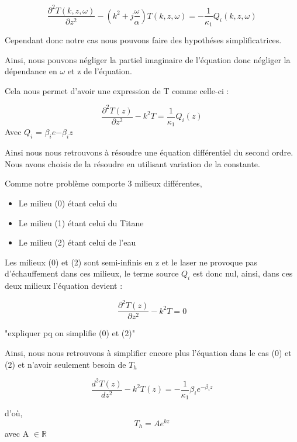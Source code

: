 \documentclass{rapportECC}
\begin{document}
\begin{equation}
    \frac{\partial^2 T(k,z,\omega)}{\partial z^2} - (k^2 + j\frac{\omega}{\alpha}) T(k,z,\omega) = - \frac{1}{\kappa_1} Q_i(k,z,\omega)
\end{equation}

Cependant donc notre cas nous pouvons faire des hypothéses simplificatrices.

Ainsi, nous pouvons négliger la partiel imaginaire de l'équation donc négliger la dépendance en $\omega$ et z de l'équation.

Cela nous permet d'avoir une expression de T comme celle-ci :

\begin{equation}
    \frac{\partial^2 T(z)}{\partial z^2} - k^2 T = \frac{1}{\kappa_1}Q_i(z)
\end{equation}
Avec $Q_i$ = $\beta_i e{-\beta_i z}$


Ainsi nous nous retrouvons à résoudre une équation différentiel du second ordre.\\
Nous avons choisis de la résoudre en utilisant variation de la constante.

Comme notre problème comporte 3 milieux différentes,
\begin{itemize}
    \item Le milieu (0) étant celui du 
    \item Le milieu (1) étant celui du Titane
    \item Le milieu (2) étant celui de l'eau
\end{itemize}

Les milieux (0) et (2) sont semi-infinis en z et le laser ne provoque pas d'échauffement dans ces milieux, le terme source $Q_i$ est donc nul, ainsi, dans ces deux milieux l'équation devient :

\begin{equation}
    \frac{\partial^2 T(z)}{\partial z^2} - k^2 T = 0
\end{equation}

"expliquer pq on simplifie (0) et (2)"

Ainsi, nous nous retrouvons à simplifier encore plus l'équation dans le cas (0) et (2) et n'avoir seulement besoin de $T_h$

\begin{equation*}
    \frac{d^2 T(z)}{d z^2} - k^2 T(z) = - \frac{1}{\kappa_1}\beta_i e^{-\beta_iz}
\end{equation*}

d'où,
\begin{equation}
    T_h = A e^{kz} 
\end{equation}
avec A $\in \mathbb{R}$
\end{document}

